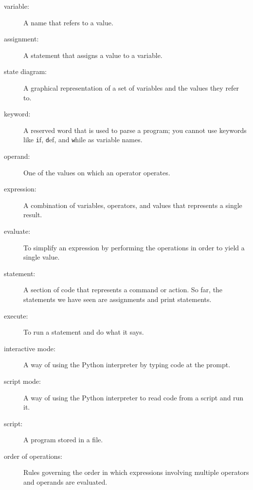 \documentclass[
DIV=11,
fontsize=12,
twoside,
headinclude=false,
titlepage=firstiscover,
abstract=true,
headsepline=true,
footsepline=true,
chapterprefix=true, %
headings=big,
bibliography=totoc,%
captions=tableheading
]{scrbook}
\theoremstyle{definition}
\begin{document}
\begin{description}

\item[variable:]  A name that refers to a value.

\item[assignment:]  A statement that assigns a value to a variable.

\item[state diagram:]  A graphical representation of a set of variables and the
values they refer to.

\item[keyword:]  A reserved word that is used to parse a
program; you cannot use keywords like {\texttt if}, {\texttt  def}, and {\texttt while} as
variable names.

\item[operand:]  One of the values on which an operator operates.

\item[expression:]  A combination of variables, operators, and values that
represents a single result.

\item[evaluate:]  To simplify an expression by performing the operations
in order to yield a single value.

\item[statement:]  A section of code that represents a command or action.  So
far, the statements we have seen are assignments and print statements.

\item[execute:]  To run a statement and do what it says.

\item[interactive mode:] A way of using the Python interpreter by
typing code at the prompt.

\item[script mode:] A way of using the Python interpreter to read
code from a script and run it.

\item[script:] A program stored in a file.

\item[order of operations:]  Rules governing the order in which
expressions involving multiple operators and operands are evaluated.


\end{description}
\end{document}
